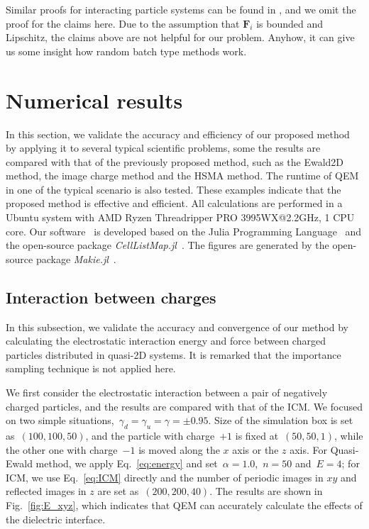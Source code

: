Similar proofs for interacting particle systems can be found in \cite{jin2020convergence,li2019stochastic,li2020random}, and we omit the proof for the claims here.  Due to the assumption that $\bm{F}_i$ is bounded and Lipschitz, the claims above are not helpful for our problem. Anyhow, it can give us some insight how random batch type methods work.

\section{Numerical results}
\label{sec:result}

In this section, we validate the accuracy and efficiency of our proposed method by applying it to several typical scientific problems, some the results are compared with that of the previously proposed method, such as the Ewald2D method, the image charge method and the HSMA method.
The runtime of QEM in one of the typical scenario is also tested.
These examples indicate that the proposed method is effective and efficient.
All calculations are performed in a Ubuntu system with AMD Ryzen Threadripper PRO 3995WX@2.2GHz, 1 CPU core.
Our software~\cite{QuasiEwald} is developed based on the Julia Programming Language~\cite{Julia-2017} and the open-source package \emph{CellListMap.jl}~\cite{celllistmap}.
The figures are generated by the open-source package \emph{Makie.jl}~\cite{DanischKrumbiegel2021}.

\subsection{Interaction between charges}

In this subsection, we validate the accuracy and convergence of our method by calculating the electrostatic interaction energy and force between charged particles distributed in quasi-2D systems.
It is remarked that the importance sampling technique is not applied here.

We first consider the electrostatic interaction between a pair of negatively charged particles, and the results are compared with that of the ICM.
We focused on two simple situations,~$\gamma_{d} = \gamma_{u} = \gamma = \pm 0.95$.
Size of the simulation box is set as~$(100, 100, 50)$, and the particle with charge~$+1$ is fixed at~$(50, 50, 1)$, while the other one with charge~$-1$ is moved along the $x$ axis or the $z$ axis.
For Quasi-Ewald method, we apply Eq.~\eqref{eq:energy} and set~$\alpha = 1.0$,~$n = 50$ and~$E = 4$; for ICM, we use Eq.~\eqref{eq:ICM} directly and the number of periodic images in $xy$ and reflected images in $z$ are set as~$(200, 200, 40)$.
The results are shown in Fig.~\ref{fig:E_xyz}, which indicates that QEM can accurately calculate the effects of the dielectric interface.

